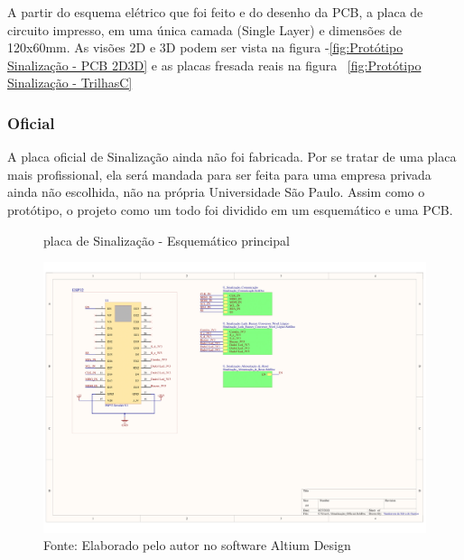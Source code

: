 \documentclass[../delivery_hospital_report.tex]{subfiles}
\begin{document}
A partir do esquema elétrico que foi feito e do desenho da PCB, a placa de circuito impresso, em uma única camada (Single Layer) e dimensões de 120x60mm. As visões 2D e 3D podem ser vista na figura -\ref{fig:Protótipo Sinalização - PCB 2D3D} e as placas fresada reais na figura ~\ref{fig:Protótipo Sinalização - TrilhasC}

\clearpage
\subsubsection{Oficial}

A placa oficial de Sinalização ainda não foi fabricada. Por se tratar de uma placa mais profissional, ela será mandada para ser feita para uma empresa privada ainda não escolhida, não na própria Universidade São Paulo. Assim como o protótipo, o projeto como um todo foi dividido em um esquemático e uma PCB.

\begin{figure}[!h]
\centering
    \caption{placa de Sinalização - Esquemático principal }
    \centering %
    \includegraphics[width=17cm]{modulos/Sinalização_Official-1.png}
    \caption*{Fonte: Elaborado pelo autor no software Altium Design\cite{altium21} }
    \label{Protótipo placa de ## - Esquemático principal}
\end{figure}
\end{document}
